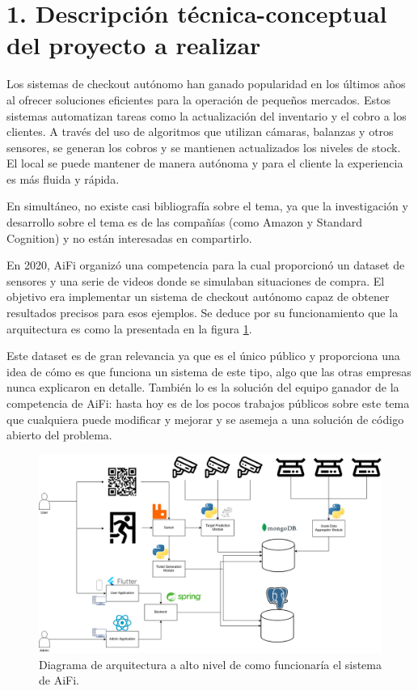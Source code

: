 \documentclass[
11pt, %
]{charter}
\begin{document}
\section{1. Descripción técnica-conceptual del proyecto a realizar}
\label{sec:descripcion}

Los sistemas de checkout autónomo han ganado popularidad en los últimos años al ofrecer soluciones eficientes para la operación de pequeños mercados. Estos sistemas automatizan tareas como la actualización del inventario y el cobro a los clientes. A través del uso de algoritmos que utilizan cámaras, balanzas y otros sensores, se generan los cobros y se mantienen actualizados los niveles de stock. El local se puede mantener de manera autónoma y para el cliente la experiencia es más fluida y rápida.

En simultáneo, no existe casi bibliografía sobre el tema, ya que la investigación y desarrollo sobre el tema es de las compañías (como Amazon y Standard Cognition) y no están interesadas en compartirlo.

En 2020, AiFi organizó una competencia para la cual proporcionó un dataset de sensores y una serie de videos donde se simulaban situaciones de compra. El objetivo era implementar un sistema de checkout autónomo capaz de obtener resultados precisos para esos ejemplos. Se deduce por su funcionamiento que la arquitectura es como la presentada en la figura \ref{fig:arqAifi}.

Este dataset es de gran relevancia ya que es el único público y proporciona una idea de cómo es que funciona un sistema de este tipo, algo que las otras empresas nunca explicaron en detalle. También lo es la solución del equipo ganador de la competencia de AiFi: hasta hoy es de los pocos trabajos públicos sobre este tema que cualquiera puede modificar y mejorar y se asemeja a una solución de código abierto del problema.

\begin{figure}[htpb]
\centering 
\includegraphics[width=1.05\textwidth]{./Figuras/Arquitectura TDG-Arch proposal.drawio.png}
\caption{Diagrama de arquitectura a alto nivel de como funcionaría el sistema de AiFi.}
\label{fig:arqAifi}
\end{figure}
\end{document}
